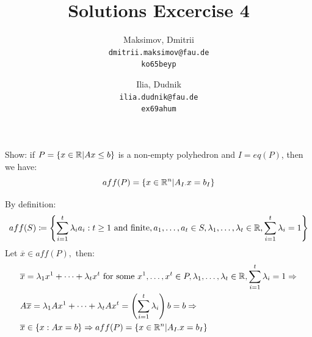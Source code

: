 \documentclass{homework}
\title{Solutions Excercise 4}
\author{
  Maksimov, Dmitrii\\
  \texttt{dmitrii.maksimov@fau.de} \\
  \texttt{ko65beyp}
  \and
  Ilia, Dudnik\\
  \texttt{ilia.dudnik@fau.de}\\
  \texttt{ex69ahum}
}
\begin{document}
\maketitle

\exercise
Show: if $P=\{x\in \mathbb R | Ax\leq b\}$ is a non-empty polyhedron and $I=eq(P)$, then we have: \[aff(P)=\{x\in \mathbb R^n|A_{I\cdot}x=b_I\}\]

By definition: \[aff(S)\coloneqq \left\{\sum_{i=1}^t \lambda_i a_i:t\geq 1\text{ and finite}, a_1, \dots, a_t \in S, \lambda_1, \dots, \lambda_t \in \mathbb R, \sum_{i=1}^t \lambda_i = 1\right\} \]
Let $\overline{x} \in aff(P),$ then:
\begin{align*}
	&\overline{x} = \lambda_1 x^1 + \dots + \lambda_t x^t \text{ for some } x^1, \dots, x^t \in P, \lambda_1, \dots, \lambda_t \in \mathbb R, \sum_{i=1}^t \lambda_i=1 \Rightarrow\\
	&A\overline{x}=\lambda_1 Ax^1+\dots + \lambda_t Ax^t = \left(\sum_{i=1}^t\lambda_i\right)b=b\Rightarrow\\
	&\overline{x} \in \{x:Ax=b\} \Rightarrow aff(P)=\{x\in \mathbb R^n|A_{I\cdot}x=b_I\}
\end{align*}
\end{document}
